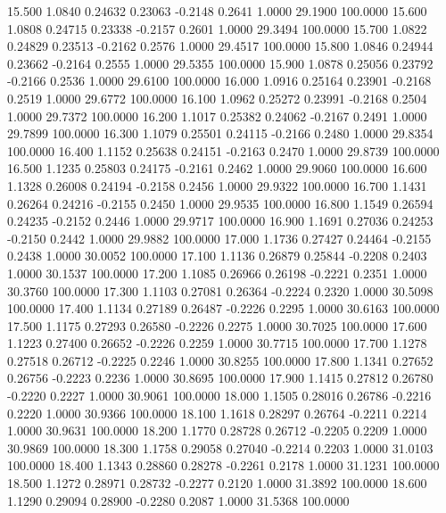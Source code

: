   15.500   1.0840   0.24632   0.23063  -0.2148   0.2641   1.0000  29.1900 100.0000
  15.600   1.0808   0.24715   0.23338  -0.2157   0.2601   1.0000  29.3494 100.0000
  15.700   1.0822   0.24829   0.23513  -0.2162   0.2576   1.0000  29.4517 100.0000
  15.800   1.0846   0.24944   0.23662  -0.2164   0.2555   1.0000  29.5355 100.0000
  15.900   1.0878   0.25056   0.23792  -0.2166   0.2536   1.0000  29.6100 100.0000
  16.000   1.0916   0.25164   0.23901  -0.2168   0.2519   1.0000  29.6772 100.0000
  16.100   1.0962   0.25272   0.23991  -0.2168   0.2504   1.0000  29.7372 100.0000
  16.200   1.1017   0.25382   0.24062  -0.2167   0.2491   1.0000  29.7899 100.0000
  16.300   1.1079   0.25501   0.24115  -0.2166   0.2480   1.0000  29.8354 100.0000
  16.400   1.1152   0.25638   0.24151  -0.2163   0.2470   1.0000  29.8739 100.0000
  16.500   1.1235   0.25803   0.24175  -0.2161   0.2462   1.0000  29.9060 100.0000
  16.600   1.1328   0.26008   0.24194  -0.2158   0.2456   1.0000  29.9322 100.0000
  16.700   1.1431   0.26264   0.24216  -0.2155   0.2450   1.0000  29.9535 100.0000
  16.800   1.1549   0.26594   0.24235  -0.2152   0.2446   1.0000  29.9717 100.0000
  16.900   1.1691   0.27036   0.24253  -0.2150   0.2442   1.0000  29.9882 100.0000
  17.000   1.1736   0.27427   0.24464  -0.2155   0.2438   1.0000  30.0052 100.0000
  17.100   1.1136   0.26879   0.25844  -0.2208   0.2403   1.0000  30.1537 100.0000
  17.200   1.1085   0.26966   0.26198  -0.2221   0.2351   1.0000  30.3760 100.0000
  17.300   1.1103   0.27081   0.26364  -0.2224   0.2320   1.0000  30.5098 100.0000
  17.400   1.1134   0.27189   0.26487  -0.2226   0.2295   1.0000  30.6163 100.0000
  17.500   1.1175   0.27293   0.26580  -0.2226   0.2275   1.0000  30.7025 100.0000
  17.600   1.1223   0.27400   0.26652  -0.2226   0.2259   1.0000  30.7715 100.0000
  17.700   1.1278   0.27518   0.26712  -0.2225   0.2246   1.0000  30.8255 100.0000
  17.800   1.1341   0.27652   0.26756  -0.2223   0.2236   1.0000  30.8695 100.0000
  17.900   1.1415   0.27812   0.26780  -0.2220   0.2227   1.0000  30.9061 100.0000
  18.000   1.1505   0.28016   0.26786  -0.2216   0.2220   1.0000  30.9366 100.0000
  18.100   1.1618   0.28297   0.26764  -0.2211   0.2214   1.0000  30.9631 100.0000
  18.200   1.1770   0.28728   0.26712  -0.2205   0.2209   1.0000  30.9869 100.0000
  18.300   1.1758   0.29058   0.27040  -0.2214   0.2203   1.0000  31.0103 100.0000
  18.400   1.1343   0.28860   0.28278  -0.2261   0.2178   1.0000  31.1231 100.0000
  18.500   1.1272   0.28971   0.28732  -0.2277   0.2120   1.0000  31.3892 100.0000
  18.600   1.1290   0.29094   0.28900  -0.2280   0.2087   1.0000  31.5368 100.0000
